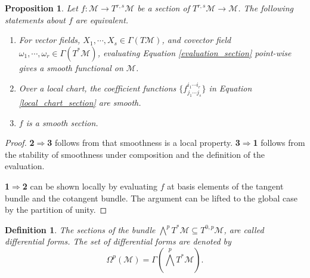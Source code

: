 \documentclass[8pt]{article}
\newtheorem{proposition}{Proposition}[section]
\newtheorem{definition}{Definition}[section]
\newcommand{\M}[0]{\mathcal{M}}
\newcommand{\cinf}[0]{\mathcal{C}^\infty}
\newcommand{\pd}[2]{{\frac {\partial #1} {\partial #2}}}
\begin{document}
\begin{proposition}
  Let $f:\M\to T^{r,s}\M$ be a section of $T^{r,s}\M\to \M$. The following statements about $f$ are equivalent.
  \begin{enumerate}[1.]
    \item For vector fields, $X_1,\cdots,X_s\in\Gamma(T\M)$, and covector field $\omega_1,\cdots,\omega_r\in\Gamma(T^*\M)$, evaluating Equation \eqref{evaluation_section} point-wise gives a smooth functional on $\M$.
    \item Over a local chart, the coefficient functions $\{f_{j_1\cdots j_s}^{i_1\cdots i_r}\}$ in Equation \eqref{local_chart_section} are smooth.
      \item $f$ is a smooth section.
  \end{enumerate}
  \label{proposition_12_2}
\end{proposition}

\begin{proof}
  \textbf{2}$\Rightarrow$\textbf{3} follows from that smoothness is a local property. \textbf{3}$\Rightarrow$\textbf{1} follows from the stability of smoothness under composition and the definition of the evaluation.
  \par \textbf{1}$\Rightarrow$\textbf{2} can be shown locally by evaluating $f$ at basis elements of the tangent bundle and the cotangent bundle. The argument can be lifted to the global case by the partition of unity.
\end{proof}

\begin{definition}
  The sections of the bundle $\bigwedge^pT^*\M\subseteq T^{0,p}\M$, are called differential forms. The set of differential forms are denoted by 
  \begin{equation*}
    \Omega^p(\M) = \Gamma\left(\bigwedge^pT^*\M\right).
  \end{equation*}
\end{definition}
\end{document}
